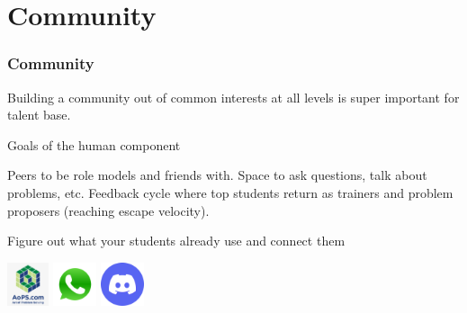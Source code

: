 \documentclass[11pt]{beamer}
\begin{document}
\section{Community}
\begin{frame}
  \frametitle{Community}
  Building a community out of common interests
  at all levels is super important for talent base.
  \begin{block}{Goals of the human component}
  \begin{itemize}
    \ii Peers to be role models and friends with.
    \ii Space to ask questions, talk about problems, etc.
    \ii Feedback cycle where top students return as trainers and problem proposers
    (reaching escape velocity).
  \end{itemize}
  \end{block}
  \pause
  \begin{exampleblock}{Figure out what your students already use and connect them}
    \begin{center}
      \includegraphics[height=0.5in]{logo-aops.png}
      \includegraphics[height=0.5in]{logo-whatsapp.png}
      \includegraphics[height=0.5in]{logo-discord.png}
    \end{center}
  \end{exampleblock}
\end{frame}
\end{document}
